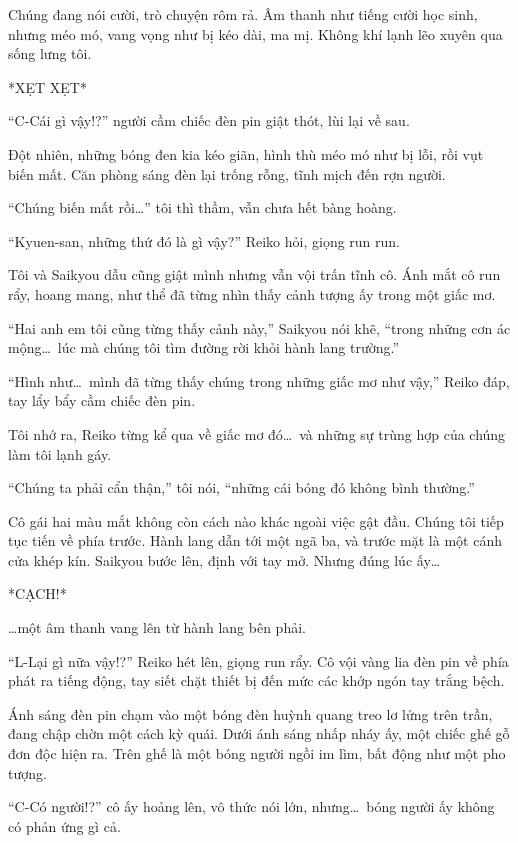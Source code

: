 \documentclass[../main.tex]{subfiles}
\begin{document}
Chúng đang nói cười, trò chuyện rôm rả. Âm thanh như tiếng cười học sinh, nhưng méo mó, vang vọng như bị kéo dài, ma mị. Không khí lạnh lẽo xuyên qua sống lưng tôi.

*XẸT XẸT*

``C-Cái gì vậy!?'' người cầm chiếc đèn pin giật thót, lùi lại về sau.

Đột nhiên, những bóng đen kia kéo giãn, hình thù méo mó như bị lỗi, rồi vụt biến mất. Căn phòng sáng đèn lại trống rỗng, tĩnh mịch đến rợn người.

``Chúng biến mất rồi\dots'' tôi thì thầm, vẫn chưa hết bàng hoàng.

``Kyuen-san, những thứ đó là gì vậy?'' Reiko hỏi, giọng run run.

Tôi và Saikyou dẫu cũng giật mình nhưng vẫn vội trấn tĩnh cô. Ánh mắt cô run rẩy, hoang mang, như thể đã từng nhìn thấy cảnh tượng ấy trong một giấc mơ.

``Hai anh em tôi cũng từng thấy cảnh này,'' Saikyou nói khẽ, ``trong những cơn ác mộng\dots\ lúc mà chúng tôi tìm đường rời khỏi hành lang trường.''

``Hình như\dots\ mình đã từng thấy chúng trong những giấc mơ như vậy,'' Reiko đáp, tay lẩy bẩy cầm chiếc đèn pin.

Tôi nhớ ra, Reiko từng kể qua về giấc mơ đó\dots\ và những sự trùng hợp của chúng làm tôi lạnh gáy.

``Chúng ta phải cẩn thận,'' tôi nói, ``những cái bóng đó không bình thường.''

Cô gái hai màu mắt không còn cách nào khác ngoài việc gật đầu. Chúng tôi tiếp tục tiến về phía trước. Hành lang dẫn tới một ngã ba, và trước mặt là một cánh cửa khép kín. Saikyou bước lên, định với tay mở. Nhưng đúng lúc ấy\dots\

*CẠCH!*

\dots một âm thanh vang lên từ hành lang bên phải.

``L-Lại gì nữa vậy!?'' Reiko hét lên, giọng run rẩy. Cô vội vàng lia đèn pin về phía phát ra tiếng động, tay siết chặt thiết bị đến mức các khớp ngón tay trắng bệch.

Ánh sáng đèn pin chạm vào một bóng đèn huỳnh quang treo lơ lửng trên trần, đang chập chờn một cách kỳ quái. Dưới ánh sáng nhấp nháy ấy, một chiếc ghế gỗ đơn độc hiện ra. Trên ghế là một bóng người ngồi im lìm, bất động như một pho tượng.

``C-Có người!?'' cô ấy hoảng lên, vô thức nói lớn, nhưng\dots\ bóng người ấy không có phản ứng gì cả.
\end{document}
